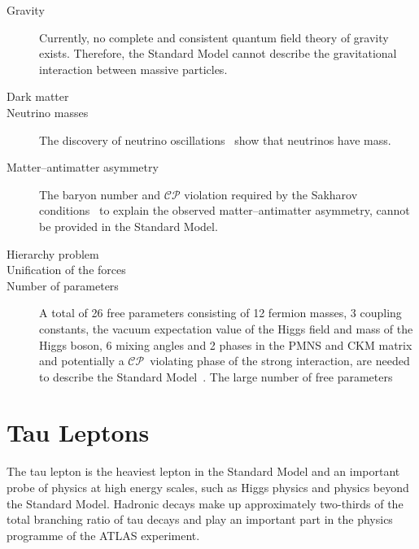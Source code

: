\begin{description}
\item[Gravity] Currently, no complete and consistent quantum field theory of
  gravity exists. Therefore, the Standard Model cannot describe the
  gravitational interaction between massive particles.

\item[Dark matter]

\item[Neutrino masses] The discovery of neutrino
  oscillations~\cite{superk_neutrino, sno_neutrino_1, sno_neutrino_2} show that
  neutrinos have mass.

\item[Matter--antimatter asymmetry] The baryon number and $\mathcal{CP}$
  violation required by the Sakharov conditions~\cite{sakharov} to explain the
  observed matter--antimatter asymmetry, cannot be provided in the Standard
  Model.

\item[Hierarchy problem]

\item[Unification of the forces]

\item[Number of parameters] A total of 26 free parameters consisting of 12
  fermion masses, 3 coupling constants, the vacuum expectation value of the
  Higgs field and mass of the Higgs boson, 6 mixing angles and 2 phases in the
  PMNS and CKM matrix and potentially a $\mathcal{CP}$~violating phase of the
  strong interaction, are needed to describe the Standard Model~\cite{thomson}.
  The large number of free parameters
\end{description}

\section{Tau Leptons}



The tau lepton is the heaviest lepton in the Standard Model and an important
probe of physics at high energy scales, such as Higgs physics and physics beyond
the Standard Model. Hadronic decays make up approximately two-thirds of the
total branching ratio of tau decays and play an important part in the physics
programme of the ATLAS experiment.

